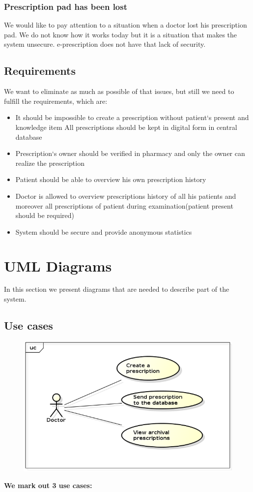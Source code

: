 \subsubsection{Prescription pad has been lost}
We would like to pay attention to a situation when a doctor lost his prescription pad. We do not know how it works today but it is a situation that makes the system unsecure. e-prescription does not have that lack of security. 

\subsection{Requirements}
We want to eliminate as much as possible of that issues, but still we need to fulfill the requirements, which are:\\
\begin{itemize}
\item It should be impossible to create a prescription without patient`s present and knowledge
item All prescriptions should be kept in digital form in central database
\item Prescription`s owner should be verified in pharmacy and only the owner can realize the prescription
\item Patient should be able to overview his own prescription history
\item Doctor is allowed to overview prescriptions history of all his patients and moreover all prescriptions of patient during examination(patient present should be required) 
\item System should be secure and provide anonymous statistics

\end{itemize}

\newpage
\section{UML Diagrams}
In this section we present diagrams that are needed to describe part of the system.
\subsection{Use cases}
\begin{figure}[h]
\centering
\includegraphics[width=1\textwidth]{doctor/UseCases.png}
\end{figure} 
\textbf{We mark out 3 use cases:}

